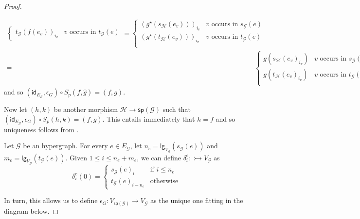 \documentclass[3p]{elsarticle}
\newcommand{\lgh}{\mathsf{lg}}
\renewcommand{\sp}{\mathsf{sp}}
\newcommand{\mto}{\rightarrowtail}
\newcommand{\id}[1]{\mathsf{id}_{#1}}
\theoremstyle{remark}
\theoremstyle{definition}
\begin{document}
\begin{proof}
\begin{enumerate}
\begin{align*}
\begin{cases}
		t_{\mathcal{G}}(f(e_v))_{i_v}& v \text{ occurs in } t_{\mathcal{G}}(e)
	\end{cases}= \begin{cases}
		(g^\star(s_{\mathcal{H}}(e_v)))_{i_v}& v \text{ occurs in } s_{\mathcal{G}}(e)\\
		(g^\star(t_{\mathcal{H}}(e_v)))_{i_v}& v \text{ occurs in } t_{\mathcal{G}}(e)\\
	\end{cases}\\=&\begin{cases}
		g(s_{\mathcal{H}}(e_v)_{i_v})& v \text{ occurs in } s_{\mathcal{G}}(e)\\
		g(t_{\mathcal{H}}(e_v)_{i_v})& v \text{ occurs in } t_{\mathcal{G}}(e)\\
	\end{cases}=g(v)
\end{align*}
and so $(\id{E_{\mathcal{G}}}, \epsilon_{G})\circ S_p(f, \hat{g})=(f,g)$.

Now let $(h,k)$ be another morphism $\mathcal{H}\to \sp(\mathcal{G})$ such that $(\id{E_{\mathcal{G}}}, \epsilon_{G})\circ S_p(h, k)=(f,g)$. This entails immediately that $h =f$ and so uniqueness follows from .	\qedhere 
	\end{enumerate}	

	Let $\mathcal{G}$ be an hypergraph. For every $e\in E_{\mathcal{G}}$, let $n_e=\lgh_{V_{\mathcal{G}}}(s_{\mathcal{G}}(e))$ and $m_e=\lgh_{V_{\mathcal{G}}}(t_{\mathcal{G}}(e))$. Given $1\leq i\leq n_e+m_e$,  we can define $\delta^e_i\colon \mto V_{\mathcal{G}}$ as
	\[\delta^e_i(0) =\begin{cases}
		s_{\mathcal{G}}(e)_i & \mbox{if } i\leq n_e\\
		t_{\mathcal{G}}(e)_{i-n_e} &  \mbox{otherwise}
	\end{cases}\]
	
In turn, this allows us to define $\epsilon_{G}\colon V_{\sp(\mathcal{G})}\to V_{\mathcal{G}}$ as the unique one fitting in the diagram below.
	

\end{proof}
\end{document}
